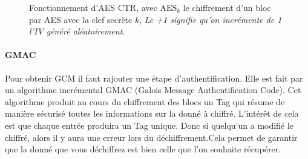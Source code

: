 \documentclass[a4paper, 12pt]{article}
\begin{document}
\begin{figure}[h]
\caption{Fonctionnement d'AES CTR, avec $\text{AES}_k$ le chiffrement d'un bloc par AES avec la clef secrète $k$, \emph{Le +1 signifie qu'on incrémente de 1 l'IV généré aléatoirement.}
}
\label{aesctr}
\end{figure}

\paragraph{GMAC} \label{GMAC}

Pour obtenir GCM il faut rajouter une étape d'authentification. Elle est fait par un algorithme incrémental GMAC (Galois Message Authentification Code). Cet algorithme produit au cours du chiffrement des blocs un Tag qui résume de manière sécurisé toutes les informations sur la donné à chiffré. L'intérêt de cela est que chaque entrée produira un Tag unique. Donc si quelqu'un a modifié le chiffré, alors il y aura une erreur lors du déchiffrement.Cela permet de garantir que la donné que vous déchiffrez est bien celle que l'on souhaite récupérer.
\end{document}
